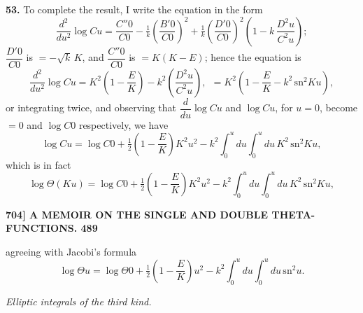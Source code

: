 \documentclass[11pt]{article}
\begin{document}
\medskip
\textbf{53.} To complete the result, I write the equation in the form
\[
\frac{d^2}{du^2}\log Cu = \frac{C''0}{C0} - \tfrac{1}{k}\!\left(\frac{B'0}{C0}\right)^{\!2}\!+ \tfrac{1}{k}\!\left(\frac{D'0}{C0}\right)^{\!2}\!\left(1 - k\,\frac{D^2 u}{C^2 u}\right);
\]
$\dfrac{D'0}{C0}$ is $=-\sqrt{k}\,K$, and $\dfrac{C''0}{C0}$ is $=K(K-E)$; hence the equation is
\[
\frac{d^2}{du^2}\log Cu = K^2\!\left(1 - \frac{E}{K}\right) - k^2\!\left(\frac{D^2 u}{C^2 u}\right),\ \ = K^2\!\left(1 - \frac{E}{K} - k^2\,\mathrm{sn}^2 Ku\right),
\]
or integrating twice, and observing that $\dfrac{d}{du}\log Cu$ and $\log Cu$, for $u=0$, become $=0$ and $\log C0$ respectively, we have
\[
\log Cu = \log C0 + \tfrac{1}{2}\!\left(1 - \frac{E}{K}\right)\!K^2 u^2 - k^2\!\int_0^u\!du\!\int_0^u du\,K^2\,\mathrm{sn}^2 Ku,
\]
which is in fact
\[
\log\Theta(Ku) = \log C0 + \tfrac{1}{2}\!\left(1 - \frac{E}{K}\right)\!K^2 u^2 - k^2\!\int_0^u\!du\!\int_0^u du\,K^2\,\mathrm{sn}^2 Ku,
\]

\bigskip
\noindent\textbf{704] \hfill A MEMOIR ON THE SINGLE AND DOUBLE THETA-FUNCTIONS. \hfill 489}

\medskip
agreeing with Jacobi's formula
\[
\log\Theta u = \log\Theta 0 + \tfrac{1}{2}\!\left(1 - \frac{E}{K}\right)\!u^2 - k^2\!\int_0^u\!du\!\int_0^u du\,\mathrm{sn}^2 u.
\]

\medskip
\begin{center}\textit{Elliptic integrals of the third kind.}\end{center}
\end{document}
